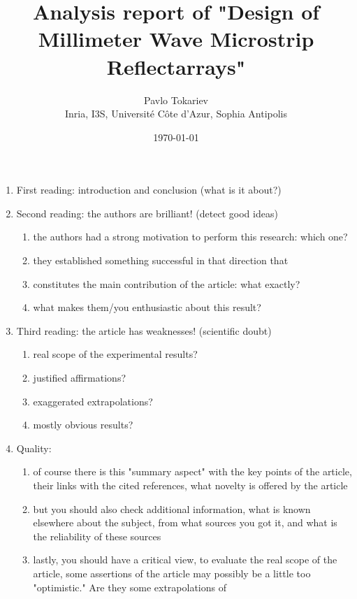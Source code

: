 \documentclass{article}
\title{Analysis report of "Design of Millimeter Wave Microstrip Reflectarrays"}
\author{Pavlo Tokariev\\Inria, I3S, Université Côte d'Azur, Sophia Antipolis}
\date{\today}
\begin{document}
    \maketitle

    \begin{enumerate}
        \item First reading: introduction and conclusion (what is it about?)
        \item Second reading: the authors are brilliant! (detect good ideas)
        \begin{enumerate}
            \item the authors had a strong motivation to perform this research: which one?
            \item they established something successful in that direction that
            \item constitutes the main contribution of the article: what exactly?
            \item what makes them/you enthusiastic about this result?
        \end{enumerate}
        \item Third reading: the article has weaknesses! (scientific doubt)
        \begin{enumerate}
            \item real scope of the experimental results?
            \item justified affirmations?
            \item exaggerated extrapolations?
            \item mostly obvious results?
        \end{enumerate}
        \item Quality:
        \begin{enumerate}
            \item of course there is this "summary aspect" with the key points of
            the article, their links with the cited references, what novelty is
            offered by the article
            \item but you should also check additional information, what is
            known elsewhere about the subject, from what sources you got
            it, and what is the reliability of these sources
            \item lastly, you should have a critical view, to evaluate the real
            scope of the article, some assertions of the article may possibly
            be a little too "optimistic." Are they some extrapolations of

\end{enumerate}
\end{enumerate}
\end{document}
